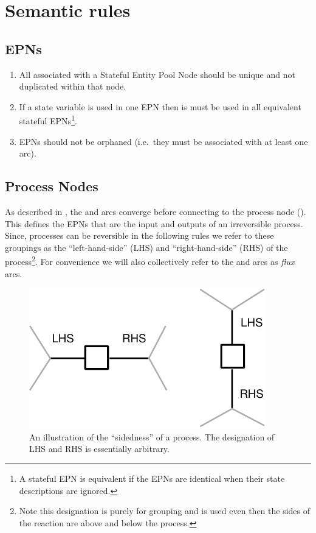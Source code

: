 \section{Semantic rules}

\subsection{EPNs}

 \begin{enumerate}
   \item All  associated with a Stateful Entity Pool Node should be unique and not duplicated within that node.
   \item If a state variable is used in one EPN then is must be used in all equivalent stateful EPNs\footnote{A stateful EPN is equivalent if the EPNs are identical when their state descriptions are ignored.}.
   \item EPNs should not be orphaned (i.e.\, they must be associated with at least one arc).
 \end{enumerate}

\subsection{Process Nodes}

As described in , the  and  arcs converge before connecting to the process node (). This defines the EPNs that are the input and outputs of an irreversible process. Since, processes can be reversible in the following rules we refer to these groupings as the ``left-hand-side'' (LHS) and ``right-hand-side'' (RHS) of the process\footnote{Note this designation is purely for grouping and is used even then the sides of the reaction are above and below the process.}. For convenience we will also collectively refer to the  and  arcs as \emph{flux} arcs.

\begin{figure}[H]
  \centering
  \includegraphics[scale = 0.8]{images/build/process_sidedness.pdf}
  \caption{An illustration of the ``sidedness'' of a process. The designation of LHS and RHS is essentially arbitrary.}
  \label{fig:process-sidedness}
\end{figure}

